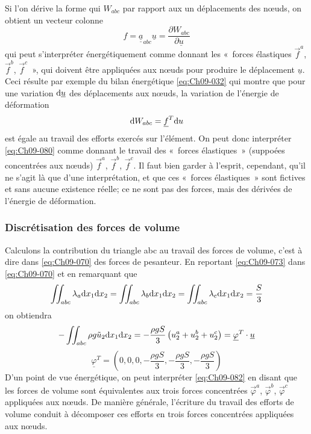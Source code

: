 Si l'on dérive la forme qui  $W_{abc}$ par rapport aux 
un déplacements des nœuds, on obtient un vecteur colonne
\begin{equation}
    f = \underline{\underline{a}}_{abc} \underline{u} = \frac{\partial W_{abc}}{\partial \underline{u}}
    \label{eq:Ch09-079}
\end{equation}
qui peut s'interpréter énergétiquement comme donnant les «~forces élastiques $\vec{f}^a$, $\vec{f}^b$, $\vec{f}^c$~», qui doivent être appliquées aux nœuds pour produire le déplacement $\underline{u}$.
Ceci résulte par exemple du bilan énergétique \eqref{eq:Ch09-032} qui montre que pour une variation $\mathrm{d} \underline{u}$ des déplacements aux nœuds, la variation de l'énergie de déformation 
\begin{equation}
    \mathrm{d} W_{abc} = \underline{f}^T \mathrm{d} u
    \label{eq:Ch09-080}
\end{equation}
est égale au travail des efforts exercés sur l'élément.
On peut donc interpréter \eqref{eq:Ch09-080} comme donnant le travail des «~forces élastiques~» (suppoées concentrées aux nœuds) $\vec{f}^a$, $\vec{f}^b$, $\vec{f}^c$.
Il faut bien garder à l'esprit, cependant, qu'il ne s'agit là que d'une interprétation, et que ces «~forces élastiques~» sont fictives et sans aucune existence réelle; ce ne sont pas 
des forces, mais des dérivées de l'énergie de déformation. 

\subsubsection{Discrétisation des forces de volume}
Calculons la contribution du triangle abc au travail des forces de volume, c'est à dire dans \eqref{eq:Ch09-070} des forces de pesanteur.
En reportant \eqref{eq:Ch09-073} dans \eqref{eq:Ch09-070} et en remarquant que 
\begin{equation}
    \iint_{abc} \lambda_a \mathrm{d} x_1 \mathrm{d} x_2 = \iint_{abc} \lambda_b \mathrm{d} x_1 \mathrm{d} x_2 = \iint_{abc} \lambda_c \mathrm{d} x_1 \mathrm{d} x_2 = \frac{S}{3}
    \label{eq:Ch09-081}
\end{equation}
on obtiendra
\begin{equation}
    -\iint_{abc} \rho g \tilde{u}_2 \mathrm{d} x_1 \mathrm{d} x_2 = - \frac{\rho g S}{3} \left( u_2^a + u_2^b + u_2^c \right) = \underline{\varphi}^T \cdot \underline{u}
    \label{eq:Ch09-082}
\end{equation}
\begin{equation}
    \underline{\varphi}^T = \left( 0, 0, 0, -\frac{\rho g S}{3}, -\frac{\rho g S}{3}, -\frac{\rho g S}{3} \right)
    \label{eq:Ch09-083}
\end{equation}
D'un point de vue énergétique, on peut interpréter \eqref{eq:Ch09-082} en disant que les forces de volume sont équivalentes aux trois forces concentrées $\vec{\varphi}^a$, $\vec{\varphi}^b$, $\vec{\varphi}^c$ appliquées aux nœuds. 
De manière générale, l'écriture du travail des efforts de volume conduit à décomposer ces efforts en trois forces concentrées appliquées aux nœuds. 

